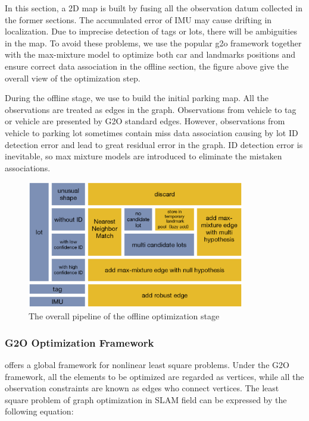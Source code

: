 \documentclass[journal]{IEEEtran}
\begin{document}
In this section, a 2D map is built by fusing all the observation datum collected in the former sections. 
The accumulated error of IMU may cause drifting in localization. 
Due to imprecise detection of tags or lots, there will be ambiguities in the map. 
To avoid these problems, we use the popular g2o\cite{K2011G2o} framework together with the max-mixture model \cite{Pfingsthorn2014Representing} to optimize both car and landmarks positions and ensure correct data association in the offline section, the figure above give the overall view of the optimization step.

During the offline stage, we use \cite{K2011G2o} to build the initial parking map. 
All the observations are treated as edges in the graph. 
Observations from vehicle to tag or vehicle are presented by G2O standard edges. 
However, observations from vehicle to parking lot sometimes contain miss data association causing by lot ID detection error and lead to great residual error in the graph. 
ID detection error is inevitable, so max mixture models \cite{Pfingsthorn2014Representing} are introduced to eliminate the mistaken associations.

\begin{figure}
\centering
\includegraphics[height = 2.2in]{pic/fig8_Optimize}
\caption{
The overall pipeline of the offline optimization stage
}\label{fig:8}
\end{figure}

\subsubsection{G2O Optimization Framework}
\cite{K2011G2o} offers a global framework for nonlinear least square problems. 
Under the G2O framework, all the elements to be optimized are regarded as vertices, while all the observation constraints are known as edges who connect vertices. 
The least square problem of graph optimization in SLAM field can be expressed by the following equation:
\end{document}
